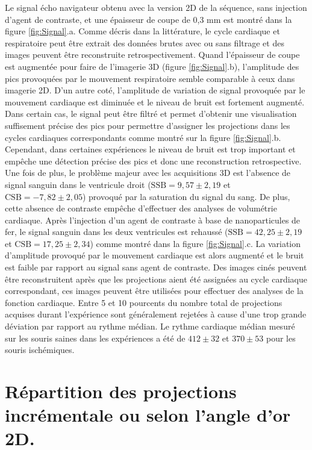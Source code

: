 Le signal écho navigateur obtenu avec la version 2D de la séquence, sans injection d'agent de contraste, et une épaisseur de coupe de 0,3 mm est montré dans la figure \ref{fig:Signal}.a. Comme décris dans la littérature, le cycle cardiaque et respiratoire peut être extrait des données brutes avec ou sans filtrage et des images peuvent être reconstruite retrospectivement. Quand l'épaisseur de coupe est augmentée pour faire de l'imagerie 3D (figure \ref{fig:Signal}.b), l'amplitude des pics provoquées par le mouvement respiratoire semble comparable à ceux dans imagerie 2D. D'un autre coté, l'amplitude de variation de signal provoquée par le mouvement cardiaque est diminuée et le niveau de bruit est fortement augmenté. Dans certain cas, le signal peut être filtré et permet d'obtenir une visualisation suffisement précise des pics pour permettre d'assigner les projections dans les cycles cardiaques correspondants comme montré sur la figure \ref{fig:Signal}.b. Cependant, dans certaines expériences le niveau de bruit est trop important et empêche une détection précise des pics et donc une reconstruction retrospective. Une fois de plus, le problème majeur avec les acquisitions 3D est l'absence de signal sanguin dans le ventricule droit ($\text{SSB}= 9,57 \pm 2,19$ et $\text{CSB}= -7,82 \pm 2,05$) provoqué par la saturation du signal du sang. De plus, cette absence de contraste empêche d'effectuer des analyses de volumétrie cardiaque.
Après l'injection d'un agent de contraste à base de nanoparticules de fer, le signal sanguin dans les deux ventricules est rehaussé ($\text{SSB}= 42,25 \pm 2,19$ et $\text{CSB}= 17,25 \pm 2,34$) comme montré dans la figure \ref{fig:Signal}.c. La variation d'amplitude provoqué par le mouvement cardiaque est alors augmenté et le bruit est faible par rapport au signal sans agent de contraste. Des images cinés peuvent être reconstruitent après que les projections aient été assignées au cycle cardiaque correspondant, ces images peuvent être utilisées pour effectuer des analyses de la fonction cardiaque. Entre 5 et 10  pourcents du nombre total de projections acquises durant l'expérience sont généralement rejetées à cause d'une trop grande déviation par rapport au rythme médian. Le rythme cardiaque médian mesuré sur les souris saines dans les expériences a été de $412 \pm 32$ et $370 \pm 53$ pour les souris ischémiques.

\section{Répartition des projections incrémentale ou selon l'angle d'or 2D.}

